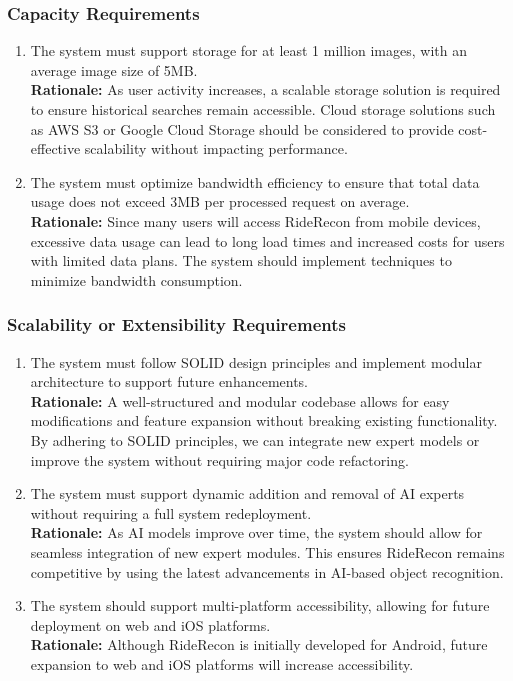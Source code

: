 \documentclass[]{article}
\begin{document}
\subsubsection{Capacity Requirements}
\label{ssub:capacity_requirements}
\begin{enumerate}[label={PR-C\arabic*.}]
    \item The system must support storage for at least 1 million images, with an average image size of 5MB.\\
	\textbf{Rationale:} As user activity increases, a scalable storage solution is required to ensure historical searches remain accessible. Cloud storage solutions such as AWS S3 or Google Cloud Storage should be considered to provide cost-effective scalability without impacting performance. 
	\item The system must optimize bandwidth efficiency to ensure that total data usage does not exceed 3MB per processed request on average.\\
	\textbf{Rationale:} Since many users will access RideRecon from mobile devices, excessive data usage can lead to long load times and increased costs for users with limited data plans. The system should implement techniques to minimize bandwidth consumption.
\end{enumerate}

\subsubsection{Scalability or Extensibility Requirements}
\label{ssub:scalability_or_extensibility_requirements}
\begin{enumerate}[label={PR-SE\arabic*.}]
    \item The system must follow SOLID design principles and implement modular architecture to support future enhancements.\\ 
	\textbf{Rationale:} A well-structured and modular codebase allows for easy modifications and feature expansion without breaking existing functionality. By adhering to SOLID principles, we can integrate new expert models or improve the system without requiring major code refactoring.
	\item The system must support dynamic addition and removal of AI experts without requiring a full system redeployment.\\ 
	\textbf{Rationale:} As AI models improve over time, the system should allow for seamless integration of new expert modules. This ensures RideRecon remains competitive by using the latest advancements in AI-based object recognition.
	\item The system should support multi-platform accessibility, allowing for future deployment on web and iOS platforms.\\
	\textbf{Rationale:} Although RideRecon is initially developed for Android, future expansion to web and iOS platforms will increase accessibility.
\end{enumerate}
\end{document}
